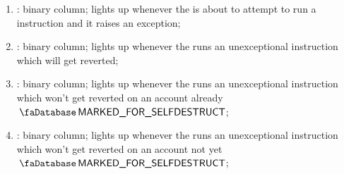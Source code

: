 \begin{enumerate}[resume]
	\item \scenSelfdestructException:
		binary column; lights up whenever the \zkEvm{} is about to attempt to run a  instruction and it raises an exception;
	\item \scenSelfdestructWillRevert:
		binary column; lights up whenever the \zkEvm{} runs an unexceptional  instruction which will get reverted;
	\item \scenSelfdestructWontRevertAlreadyMarked:
		binary column; lights up whenever the \zkEvm{} runs an unexceptional  instruction which won't get reverted on an account already $\accMarkedForSelfdestruct$;
	\item \scenSelfdestructWontRevertNotYetMarked:
		binary column; lights up whenever the \zkEvm{} runs an unexceptional  instruction which won't get reverted on an account not yet $\accMarkedForSelfdestruct$;
\end{enumerate}
